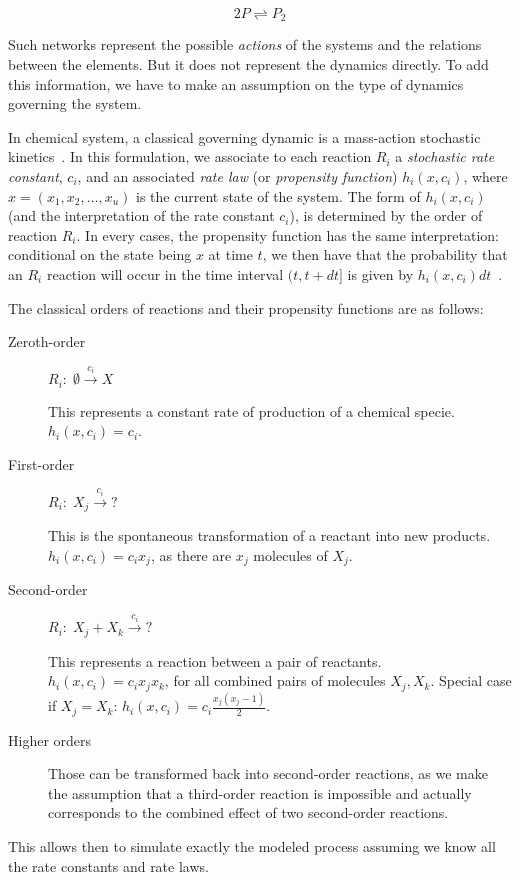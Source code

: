 	\begin{equation}\label{eq:dimerisation}
		2P \rightleftharpoons P_2
	\end{equation}
	
	Such networks represent the possible \textit{actions} of the systems and the relations between the elements. But it does not represent the dynamics directly. To add this information, we have to make an assumption on the type of dynamics governing the system.
	
	In chemical system, a classical governing dynamic is a mass-action stochastic kinetics~\cite{Horn:1972p11163}. In this formulation, we associate to each reaction $R_i$ a \textit{stochastic rate constant}, $c_i$, and an associated \textit{rate law} (or \textit{propensity function}) $h_i(x, c_i)$, where $x = (x_1, x_2, \ldots, x_u)$ is the current state of the system. The form of $h_i(x, c_i)$ (and the interpretation of the rate constant $c_i$), is determined by the order of reaction $R_i$.
	In every cases, the propensity function has the same interpretation: conditional on the state being $x$ at time $t$, we then have that the probability that an $R_i$ reaction will occur in the time interval $(t, t+dt]$ is given by $h_i(x, c_i)dt$~\cite{JamesWilkinson:2006p10341}.
	
	The classical orders of reactions and their propensity functions are as follows:
	\begin{description}
		\item[Zeroth-order] $R_i: \; \emptyset \xrightarrow{c_i} X$
		
		This represents a constant rate of production of a chemical specie.\\
		$h_i(x, c_i) = c_i$.

		\item[First-order] $R_i: \; X_j \xrightarrow{c_i} ?$
		
		This is the spontaneous transformation of a reactant into new products.\\
		$h_i(x, c_i) = c_ix_j$, as there are $x_j$ molecules of $X_j$.
		
		\item[Second-order] $R_i: \; X_j + X_k \xrightarrow{c_i} ?$
		
		This represents a reaction between a pair of reactants.\\
		$h_i(x, c_i) = c_ix_jx_k$, for all combined pairs of molecules $X_j, X_k$. Special case if $X_j=X_k$: $h_i(x, c_i) = c_i \frac{x_j(x_j-1)}{2}$.
		\item[Higher orders] Those can be transformed back into second-order reactions, as we make the assumption that a third-order reaction is impossible and actually corresponds to the combined effect of two second-order reactions.
	\end{description}
	This allows then to simulate exactly the modeled process assuming we know all the rate constants and rate laws.

